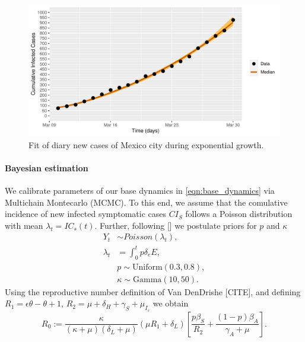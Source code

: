 \begin{figure}[htb]
    \centering
    \includegraphics[scale=0.7, keepaspectratio]{./cdmx_CIs_data_begining_fit}
    \caption{%
        Fit of diary new cases of Mexico city
        during exponential growth.
    }
    \label{fig:data_CDMX_fitting}
\end{figure}
%

\paragraph{Bayesian estimation}
We calibrate parameters of our base dynamics in
\eqref{eqn:base_dynamics} via Multichain Montecarlo (MCMC).
To this end, we assume that the comulative
incidence of new infected symptomatic cases $CI_S$
follows a Poisson distribution with mean $\lambda_t = IC_s(t)$. Further,
following [] we postulate priors for $p$ and $\kappa$
\begin{equation}
    \label{eqn:boservation_model}
    \begin{aligned}
        Y_t & \sim Poisson(\lambda_t),
        \\
        \lambda_t
        &=
        \int_{0}^t p \delta_e E ,
        \\
        & p \sim \text{Uniform} (0.3, 0.8),
        \\
        & \kappa \sim \text{Gamma}(10, 50).
    \end{aligned}
\end{equation}
%
\textbf{}
Using the reproductive number definition
of Van DenDrishe [CITE],
and defining $R_1 = \epsilon\theta- \theta +1$,
$R_2 = \mu + \delta_H+\gamma_S+\mu_{I_{s}}$
we obtain
\begin{equation*}
    \label{eqn:reproductive_number}
    R_0 :=
  \frac{\kappa}{(\kappa+\mu)(\delta_L+\mu)}\left(\mu R_1+\delta_L\right)
  \left[\frac{p\beta_S}{R_2}
  +\frac{(1-p)\beta_A}{\gamma_A+\mu}\right].
\end{equation*}

